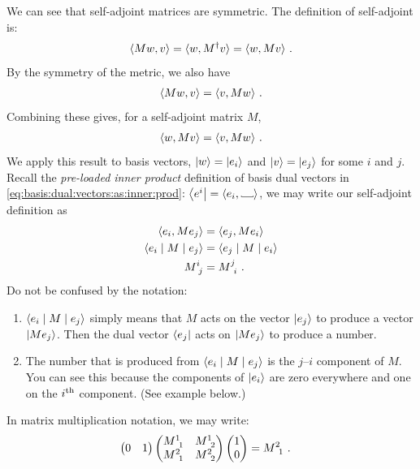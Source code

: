 \documentclass[12pt, oneside]{report}    %
\begin{document}
We can see that self-adjoint matrices are symmetric. The definition of self-adjoint is:
\begin{align}
    \langle M w, v \rangle = \langle w, M^\dag v \rangle = \langle w, M v \rangle \ .
\end{align}
By the symmetry of the metric, we also have 
\begin{align}
    \langle M w, v \rangle = \langle v, Mw \rangle \ .
\end{align}
Combining these gives, for a self-adjoint matrix $M$,
\begin{align}
    \langle w, M v \rangle = \langle v, Mw \rangle \ .
\end{align}
We apply this result to basis vectors, $\left|w\right\rangle = \left|e_i\right\rangle$ and $\left|v\right\rangle = \left|e_j\right\rangle$ for some $i$ and $j$. Recall the \emph{pre-loaded inner product} definition of basis dual vectors in \eqref{eq:basis:dual:vectors:as:inner:prod}: $\bra{e^i} = \la e_i, \slot \ra$, we may write our self-adjoint definition as 
\begin{align}
    \la e_i,  Me_j \ra &= \la e_j, M e_i \ra \\
    \la e_i \mid M \mid e_j \ra &= \la e_j \mid M \mid e_i\ra\\
    M\aij{i}{j} &= M\aij{j}{i}
    \ .
    \label{eq:self:adjoint:is:symmetric}
\end{align}
Do not be confused by the notation: 
\begin{enumerate}
    \item $\langle e_i \mid M \mid e_j \rangle$ simply means that $M$ acts on the vector $\left|e_j\right\rangle$ to produce a vector $\left|Me_j\right\rangle$. Then the dual vector $\left\langle e_j\right|$ acts on $\left|Me_j\right\rangle$ to produce a number.
    \item The number that is produced from $\langle e_i \mid M \mid e_j \rangle$ is the $j$--$i$ component of $M$. You can see this because the components of $\left|e_i\right\rangle$ are zero everywhere and one on the $i^\textnormal{th}$ component. (See example below.)
\end{enumerate}

\begin{example}
In matrix multiplication notation, we may write:
\begin{align}
    \begin{pmatrix}
        0 & 1
    \end{pmatrix}
    \begin{pmatrix}
        M\aij{1}{1} & M\aij{1}{2}\\
        M\aij{2}{1} & M\aij{2}{2}
    \end{pmatrix}
    \begin{pmatrix}
        1 \\ 0
    \end{pmatrix}
    &= 
    M\aij{2}{1} \ .
\end{align}
\end{example}
\end{document}
